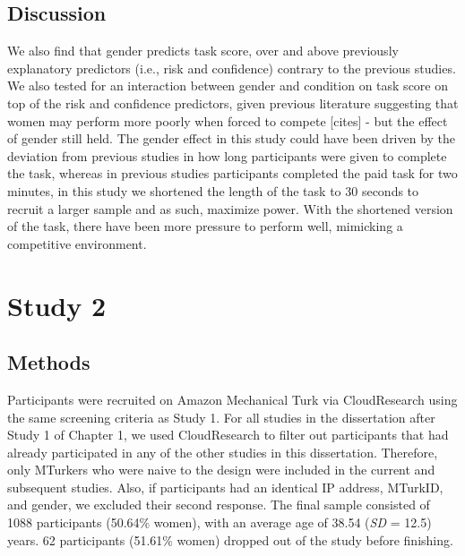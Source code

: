 \documentclass[a4paper, nobind]{templates/ociamthesis}
\begin{document}
\hypertarget{discussion}{%
\subsection{Discussion}\label{discussion}}

We also find that gender predicts task score, over and above previously explanatory predictors (i.e., risk and confidence) contrary to the previous studies. We also tested for an interaction between gender and condition on task score on top of the risk and confidence predictors, given previous literature suggesting that women may perform more poorly when forced to compete {[}cites{]} - but the effect of gender still held. The gender effect in this study could have been driven by the deviation from previous studies in how long participants were given to complete the task, whereas in previous studies participants completed the paid task for two minutes, in this study we shortened the length of the task to 30 seconds to recruit a larger sample and as such, maximize power. With the shortened version of the task, there have been more pressure to perform well, mimicking a competitive environment.

\hypertarget{study-2}{%
\section{Study 2}\label{study-2}}

\hypertarget{methods-1}{%
\subsection{Methods}\label{methods-1}}

Participants were recruited on Amazon Mechanical Turk via CloudResearch using the same screening criteria as Study 1. For all studies in the dissertation after Study 1 of Chapter 1, we used CloudResearch to filter out participants that had already participated in any of the other studies in this dissertation. Therefore, only MTurkers who were naive to the design were included in the current and subsequent studies. Also, if participants had an identical IP address, MTurkID, and gender, we excluded their second response. The final sample consisted of 1088 participants (50.64\% women), with an average age of 38.54 (\emph{SD} = 12.5) years. 62 participants (51.61\% women) dropped out of the study before finishing.
\end{document}

